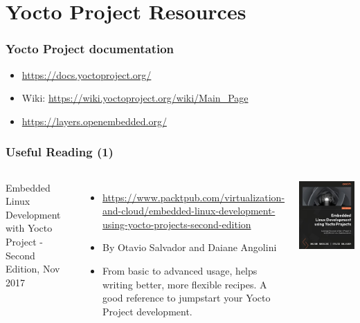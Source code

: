 \section{Yocto Project Resources}

\begin{frame}
  \frametitle{Yocto Project documentation}
  \begin{itemize}
  \item \url{https://docs.yoctoproject.org/}
  \item Wiki: \url{https://wiki.yoctoproject.org/wiki/Main_Page}
  \item \url{https://layers.openembedded.org/}
  \end{itemize}
\end{frame}

\begin{frame}
  \frametitle{Useful Reading (1)}
  \begin{columns}
    Embedded Linux Development with Yocto Project - Second Edition, Nov 2017
    \begin{itemize}
    \item \url{https://www.packtpub.com/virtualization-and-cloud/embedded-linux-development-using-yocto-projects-second-edition}
    \item By Otavio Salvador and Daiane Angolini
    \item From basic to advanced usage, helps writing better, more
      flexible recipes. A good reference to jumpstart your Yocto
      Project development.
    \end{itemize}
    \includegraphics[width=\textwidth]{slides/yocto-resources/ELDYP.jpg}
  \end{columns}
\end{frame}

